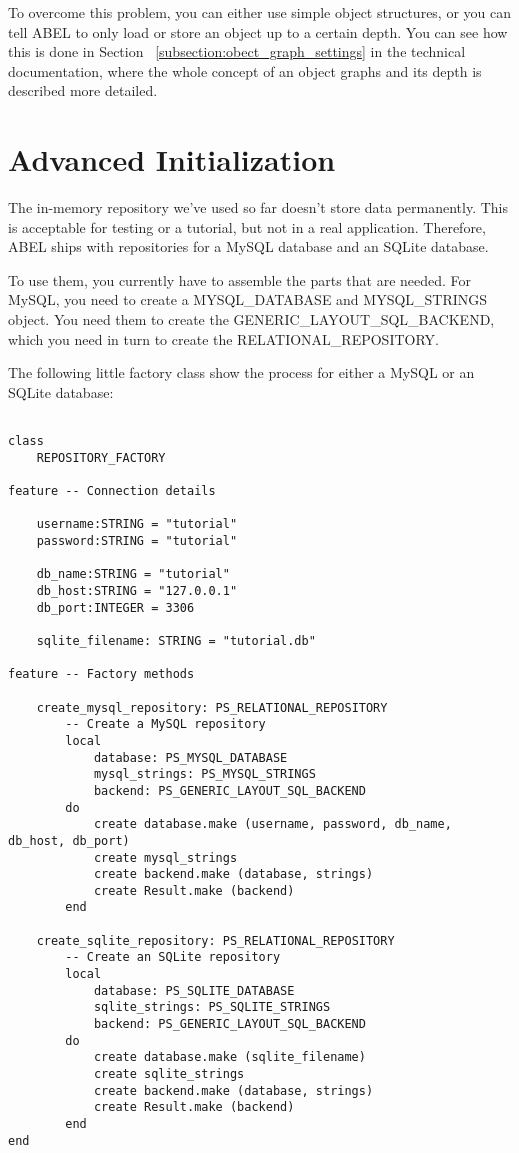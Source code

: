 To overcome this problem, you can either use simple object structures, or you can tell ABEL to only load or store an object up to a certain depth.
You can see how this is done in Section ~\ref{subsection:obect_graph_settings} in the technical documentation, where the whole concept of an object graphs and its depth is described more detailed.



\section{Advanced Initialization}
\label{section:advanced_initialization}

The in-memory repository we've used so far doesn't store data permanently.
This is acceptable for testing or a tutorial, but not in a real application.
Therefore, ABEL ships with repositories for a MySQL database and an SQLite database.

To use them, you currently have to assemble the parts that are needed.
For MySQL, you need to create a MYSQL\_DATABASE and MYSQL\_STRINGS object.
You need them to create the GENERIC\_LAYOUT\_SQL\_BACKEND, which you need in turn to create the RELATIONAL\_REPOSITORY.

The following little factory class show the process for either a MySQL or an SQLite database:

\begin{lstlisting}[language=OOSC2Eiffel, captionpos=b, caption={}, label={lst:advanced_initialization}]

class 
	REPOSITORY_FACTORY

feature -- Connection details
	
	username:STRING = "tutorial"
	password:STRING = "tutorial"

	db_name:STRING = "tutorial"
	db_host:STRING = "127.0.0.1"
	db_port:INTEGER = 3306

	sqlite_filename: STRING = "tutorial.db"

feature -- Factory methods

	create_mysql_repository: PS_RELATIONAL_REPOSITORY
		-- Create a MySQL repository
		local
			database: PS_MYSQL_DATABASE
			mysql_strings: PS_MYSQL_STRINGS
			backend: PS_GENERIC_LAYOUT_SQL_BACKEND
		do
			create database.make (username, password, db_name, db_host, db_port)
			create mysql_strings
			create backend.make (database, strings)
			create Result.make (backend)
		end

	create_sqlite_repository: PS_RELATIONAL_REPOSITORY
		-- Create an SQLite repository
		local
			database: PS_SQLITE_DATABASE
			sqlite_strings: PS_SQLITE_STRINGS
			backend: PS_GENERIC_LAYOUT_SQL_BACKEND
		do
			create database.make (sqlite_filename)
			create sqlite_strings
			create backend.make (database, strings)
			create Result.make (backend)
		end
end	

\end{lstlisting}


